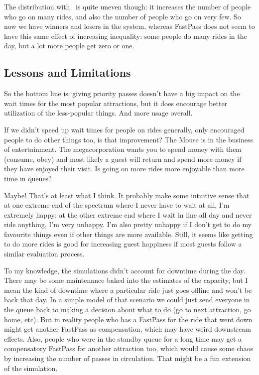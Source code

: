The distribution with \FPP~is quite uneven though: it increases the number of people who go on many rides, and also the number of people who go on very few. So now we have winners and losers in the system, whereas FastPass does not seem to have this same effect of increasing inequality: some people do many rides in the day, but a lot more people get zero or one. 

\subsection*{Lessons and Limitations}
So the bottom line is: giving priority passes doesn't have a big impact on the wait times for the most popular attractions, but it does encourage better utilization of the less-popular things. And more usage overall.

If we didn't speed up wait times for people on rides generally, only encouraged people to do other things too, is that improvement? The Mouse is in the business of entertainment. The megacorporation wants you to spend money with them (consume, obey) and most likely a guest will return and spend more money if they have enjoyed their visit. Is going on more rides more enjoyable than more time in queues? 

Maybe! That's at least what I think. It probably make some intuitive sense that at one extreme end of the spectrum where I never have to wait at all, I'm extremely happy; at the other extreme end where I wait in line all day and never ride anything, I'm very unhappy. I'm also pretty unhappy if I don't get to do my favourite things even if other things are more available. Still, it seems like getting to do more rides is good for increasing guest happiness if most guests follow a similar evaluation process. 

To my knowledge, the simulations didn't account for downtime during the day. There may be some maintenance baked into the estimates of the capacity, but I mean the kind of downtime where a particular ride just goes offline and won't be back that day. In a simple model of that scenario we could just send everyone in the queue back to making a decision about what to do (go to next attraction, go home, etc). But in reality people who has a FastPass for the ride that went down might get another FastPass as compensation, which may have weird downstream effects. Also, people who were in the standby queue for a long time may get a compensatory FastPass for another attraction too, which would cause some chaos by increasing the number of passes in circulation. That might be a fun extension of the simulation.

